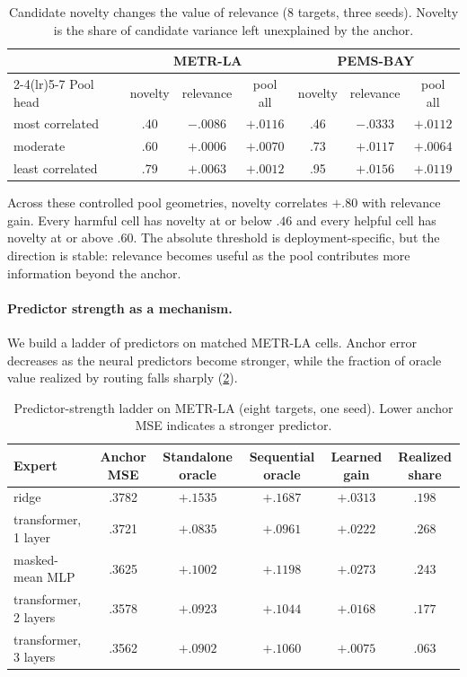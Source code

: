 \begin{table}[t]
 \centering
 \small
 \caption{Candidate novelty changes the value of relevance (8 targets, three
 seeds). Novelty is the share of candidate variance left unexplained by the
 anchor.}
 \label{tab:pool-modes}
 \begin{tabular}{lcccccc}
  \toprule
  & \multicolumn{3}{c}{METR-LA} & \multicolumn{3}{c}{PEMS-BAY}\\
  \cmidrule(lr){2-4}\cmidrule(lr){5-7}
  Pool head & novelty & relevance & pool all & novelty & relevance & pool all\\
  \midrule
  most correlated & .40 & $-.0086$ & $+.0116$ & .46 & $-.0333$ & $+.0112$\\
  moderate & .60 & $+.0006$ & $+.0070$ & .73 & $+.0117$ & $+.0064$\\
  least correlated & .79 & $+.0063$ & $+.0012$ & .95 & $+.0156$ & $+.0119$\\
  \bottomrule
 \end{tabular}
\end{table}

Across these controlled pool geometries, novelty correlates $+.80$ with
relevance gain. Every harmful cell has novelty at or below $.46$ and every
helpful cell has novelty at or above $.60$. The absolute threshold is
deployment-specific, but the direction is stable: relevance becomes useful as
the pool contributes more information beyond the anchor.

\paragraph{Predictor strength as a mechanism.}
We build a ladder of predictors on matched METR-LA cells. Anchor error decreases
as the neural predictors become stronger, while the fraction of oracle value
realized by routing falls sharply (\cref{tab:ladder}).

\begin{table}[t]
 \centering
 \small
 \caption{Predictor-strength ladder on METR-LA (eight targets, one seed). Lower
 anchor MSE indicates a stronger predictor.}
 \label{tab:ladder}
 \begin{tabular}{lccccc}
  \toprule
  Expert & Anchor MSE & Standalone oracle & Sequential oracle & Learned gain & Realized share\\
  \midrule
  ridge & .3782 & $+.1535$ & $+.1687$ & $+.0313$ & $.198$\\
  transformer, 1 layer & .3721 & $+.0835$ & $+.0961$ & $+.0222$ & $.268$\\
  masked-mean MLP & .3625 & $+.1002$ & $+.1198$ & $+.0273$ & $.243$\\
  transformer, 2 layers & .3578 & $+.0923$ & $+.1044$ & $+.0168$ & $.177$\\
  transformer, 3 layers & .3562 & $+.0902$ & $+.1060$ & $+.0075$ & $.063$\\
  \bottomrule
 \end{tabular}
\end{table}

